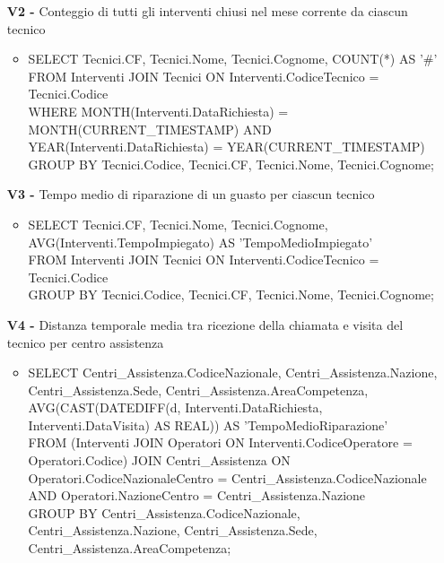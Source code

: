 \documentclass[a4paper, 12pt]{report}
\begin{document}
\begin{itemize}
\begin{itemize}[leftmargin=*, topsep=0pt]
		\end{itemize}
	\item[\textbf{V2 -}] Conteggio di tutti gli interventi chiusi nel mese corrente da ciascun tecnico
		\begin{itemize}[leftmargin=*, topsep=0pt]
			\item SELECT Tecnici.CF, Tecnici.Nome, Tecnici.Cognome, COUNT(*) AS '\#'\\
			FROM Interventi JOIN Tecnici ON Interventi.CodiceTecnico = Tecnici.Codice\\
			WHERE MONTH(Interventi.DataRichiesta) = MONTH(CURRENT\_TIMESTAMP) AND YEAR(Interventi.DataRichiesta) = YEAR(CURRENT\_TIMESTAMP)\\
			GROUP BY Tecnici.Codice, Tecnici.CF, Tecnici.Nome, Tecnici.Cognome;
		\end{itemize}
	\item[\textbf{V3 -}] Tempo medio di riparazione di un guasto per ciascun tecnico
		\begin{itemize}[leftmargin=*, topsep=0pt]
			\item SELECT Tecnici.CF, Tecnici.Nome, Tecnici.Cognome, AVG(Interventi.TempoImpiegato) AS 'TempoMedioImpiegato'\\
			FROM Interventi JOIN Tecnici ON Interventi.CodiceTecnico = Tecnici.Codice\\
			GROUP BY Tecnici.Codice, Tecnici.CF, Tecnici.Nome, Tecnici.Cognome;
		\end{itemize}
	\newpage
	\item[\textbf{V4 -}] Distanza temporale media tra ricezione della chiamata e visita del tecnico per centro assistenza
		\begin{itemize}[leftmargin=*, topsep=0pt]
			\item SELECT Centri\_Assistenza.CodiceNazionale, Centri\_Assistenza.Nazione, Centri\_Assistenza.Sede, Centri\_Assistenza.AreaCompetenza, AVG(CAST(DATEDIFF(d, Interventi.DataRichiesta, Interventi.DataVisita) AS REAL)) AS 'TempoMedioRiparazione'\\
			FROM (Interventi JOIN Operatori ON Interventi.CodiceOperatore = Operatori.Codice) JOIN Centri\_Assistenza ON Operatori.CodiceNazionaleCentro = Centri\_Assistenza.CodiceNazionale AND Operatori.NazioneCentro = Centri\_Assistenza.Nazione\\
			GROUP BY Centri\_Assistenza.CodiceNazionale, Centri\_Assistenza.Nazione, Centri\_Assistenza.Sede, Centri\_Assistenza.AreaCompetenza;
		\end{itemize}
\end{itemize}
\end{document}
